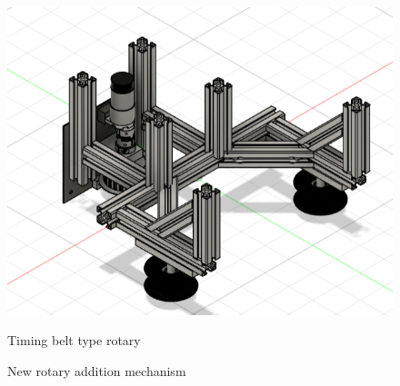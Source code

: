 \documentclass{classes/sice-si}
\begin{document}
\begin{figure}[h]
\begin{minipage}{0.4\linewidth}
        \centering
        \includegraphics[width=\linewidth]{figures/3.png}
        \caption{Timing belt type rotary}
        \label{fig:three}
    \end{minipage}
    \hfill
    \begin{minipage}{0.4\linewidth}
        \caption{New rotary addition mechanism}
        \label{fig:new}
    \end{minipage}
    \centering
    \vspace{0pt} %
\end{figure}
\end{document}
